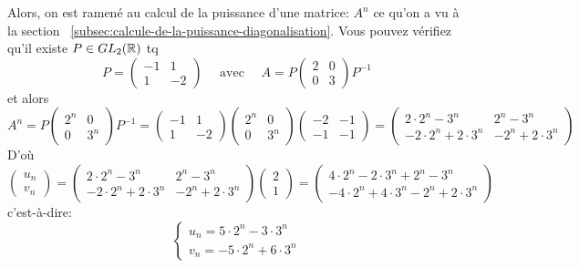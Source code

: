 Alors, on est ramené au calcul de la puissance d'une matrice: $A^n$ ce qu'on a vu à la section ~\ref{subsec:calcule-de-la-puissance-diagonalisation}. Vous pouvez vérifiez qu'il existe $P \in GL_2(\mathbb{R})$ tq 
\[
    P = \begin{pmatrix} -1 & 1 \\ 1 & -2 \end{pmatrix} \quad \text{ avec } \quad A = P\begin{pmatrix} 2 & 0 \\ 0 & 3 \end{pmatrix}P^{-1}
\] 
et alors 
\[
    A^n = P\begin{pmatrix} 2^n & 0 \\ 0 & 3^n \end{pmatrix}P^{-1} = \begin{pmatrix} -1 & 1 \\ 1 & -2 \end{pmatrix}  \begin{pmatrix} 2^n & 0 \\ 0 & 3^n \end{pmatrix}  \begin{pmatrix} -2 & -1 \\ -1 & -1 \end{pmatrix}  =  
    \begin{pmatrix}
        2 \cdot 2^n - 3^n & 2^n - 3^n \\
        -2 \cdot 2^n + 2 \cdot 3^n & -2^n + 2 \cdot 3^n
    \end{pmatrix}
\] 
D'où
\[
\begin{pmatrix} u_n \\ v_n \end{pmatrix} = 
    \begin{pmatrix}
        2 \cdot 2^n - 3^n & 2^n - 3^n \\
        -2 \cdot 2^n + 2 \cdot 3^n & -2^n + 2 \cdot 3^n
    \end{pmatrix}
    \begin{pmatrix} 2 \\ 1 \end{pmatrix} 
    =
    \begin{pmatrix}
        4 \cdot 2^n - 2 \cdot 3^n + 2^n - 3^n \\
        -4 \cdot 2^n + 4 \cdot 3^n -2^n + 2 \cdot 3^n
    \end{pmatrix}
\] 
c'est-à-dire:
\[
\begin{cases}
   u_n = 5 \cdot 2^n - 3\cdot 3^n \\
   v_n = -5 \cdot 2^n + 6\cdot 3^n
\end{cases}
\] 

